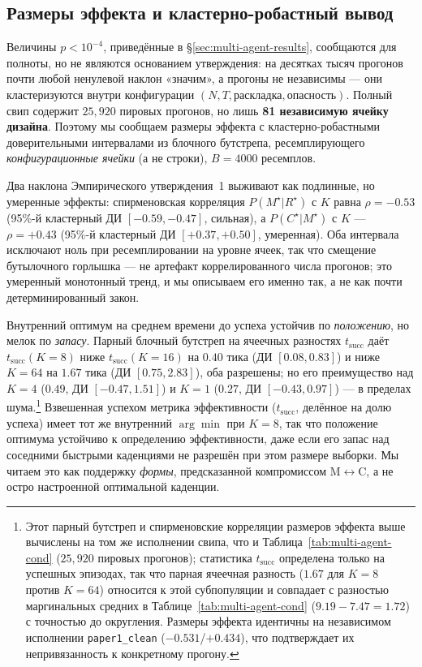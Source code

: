 \documentclass{article}
\begin{document}
\subsection{Размеры эффекта и кластерно-робастный вывод}
\label{app:effect-sizes}

Величины $p<10^{-4}$, приведённые в \S\ref{sec:multi-agent-results}, сообщаются для полноты, но не являются основанием утверждения: на десятках тысяч прогонов почти любой ненулевой наклон «значим», а прогоны не независимы --- они кластеризуются внутри конфигурации $(N,T,\text{раскладка},\text{опасность})$. Полный свип содержит $25{,}920$ пировых прогонов, но лишь \textbf{81 независимую ячейку дизайна}. Поэтому мы сообщаем размеры эффекта с кластерно-робастными доверительными интервалами из блочного бутстрепа, ресемплирующего \emph{конфигурационные ячейки} (а не строки), $B{=}4000$ ресемплов.

Два наклона Эмпирического утверждения~1 выживают как подлинные, но умеренные эффекты: спирменовская корреляция $P(M^\star|R^\star)$ с $K$ равна $\rho=-0.53$ (95\%-й кластерный ДИ $[-0.59,-0.47]$, сильная), а $P(C^\star|M^\star)$ с $K$ --- $\rho=+0.43$ (95\%-й кластерный ДИ $[+0.37,+0.50]$, умеренная). Оба интервала исключают ноль при ресемплировании на уровне ячеек, так что смещение бутылочного горлышка --- не артефакт коррелированного числа прогонов; это умеренный монотонный тренд, и мы описываем его именно так, а не как почти детерминированный закон.

Внутренний оптимум на среднем времени до успеха устойчив по \emph{положению}, но мелок по \emph{запасу}. Парный блочный бутстреп на ячеечных разностях $t_{\mathrm{succ}}$ даёт $t_{\mathrm{succ}}(K{=}8)$ ниже $t_{\mathrm{succ}}(K{=}16)$ на $0.40$ тика (ДИ $[0.08,0.83]$) и ниже $K{=}64$ на $1.67$ тика (ДИ $[0.75,2.83]$), оба разрешены; но его преимущество над $K{=}4$ ($0.49$, ДИ $[-0.47,1.51]$) и $K{=}1$ ($0.27$, ДИ $[-0.43,0.97]$) --- в пределах шума.\footnote{Этот парный бутстреп и спирменовские корреляции размеров эффекта выше вычислены на том же исполнении свипа, что и Таблица~\ref{tab:multi-agent-cond} ($25{,}920$ пировых прогонов); статистика $t_{\mathrm{succ}}$ определена только на успешных эпизодах, так что парная ячеечная разность ($1.67$ для $K{=}8$ против $K{=}64$) относится к этой субпопуляции и совпадает с разностью маргинальных средних в Таблице~\ref{tab:multi-agent-cond} ($9.19{-}7.47{=}1.72$) с точностью до округления. Размеры эффекта идентичны на независимом исполнении \texttt{paper1\_clean} ($-0.531$/$+0.434$), что подтверждает их непривязанность к конкретному прогону.} Взвешенная успехом метрика эффективности ($t_{\mathrm{succ}}$, делённое на долю успеха) имеет тот же внутренний $\arg\min$ при $K{=}8$, так что положение оптимума устойчиво к определению эффективности, даже если его запас над соседними быстрыми каденциями не разрешён при этом размере выборки. Мы читаем это как поддержку \emph{формы}, предсказанной компромиссом M$\leftrightarrow$C, а не остро настроенной оптимальной каденции.
\end{document}
